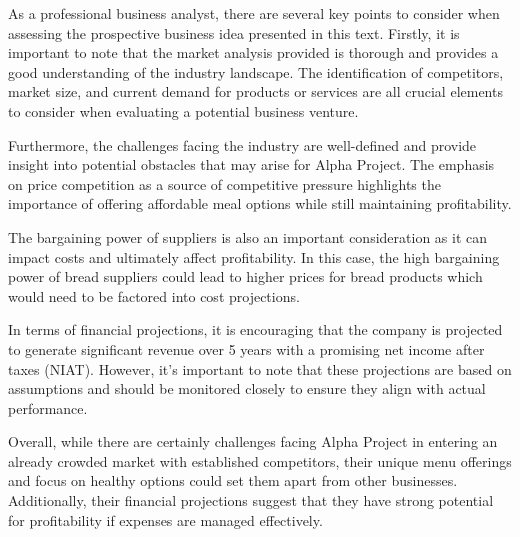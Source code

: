 As a professional business analyst, there are several key points to consider when assessing the prospective business idea presented in this text. Firstly, it is important to note that the market analysis provided is thorough and provides a good understanding of the industry landscape. The identification of competitors, market size, and current demand for products or services are all crucial elements to consider when evaluating a potential business venture.

Furthermore, the challenges facing the industry are well-defined and provide insight into potential obstacles that may arise for Alpha Project. The emphasis on price competition as a source of competitive pressure highlights the importance of offering affordable meal options while still maintaining profitability.

The bargaining power of suppliers is also an important consideration as it can impact costs and ultimately affect profitability. In this case, the high bargaining power of bread suppliers could lead to higher prices for bread products which would need to be factored into cost projections.

In terms of financial projections, it is encouraging that the company is projected to generate significant revenue over 5 years with a promising net income after taxes (NIAT). However, it's important to note that these projections are based on assumptions and should be monitored closely to ensure they align with actual performance.

Overall, while there are certainly challenges facing Alpha Project in entering an already crowded market with established competitors, their unique menu offerings and focus on healthy options could set them apart from other businesses. Additionally, their financial projections suggest that they have strong potential for profitability if expenses are managed effectively.